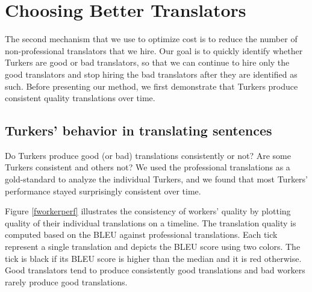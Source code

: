 \documentclass[11pt,letterpaper]{article}
\begin{document}
\section{Choosing Better Translators}

The second mechanism that we use to optimize cost is to reduce the number of non-professional translators that we hire.  Our goal is to quickly identify whether Turkers are good or bad translators, so that we can continue to hire only the good translators and stop hiring the bad translators after they are identified as such. 
%
Before presenting our method, we first demonstrate that Turkers produce consistent quality translations over time.


\subsection{Turkers' behavior in translating sentences}

Do Turkers produce good (or bad) translations consistently or not? Are some Turkers  consistent and others not? We used the professional translations as a gold-standard to analyze the individual Turkers, and we found that most Turkers' performance stayed surprisingly consistent over time. 

Figure \ref{fworkerperf} illustrates the consistency of workers' quality by plotting quality of their individual translations on a timeline. The translation quality is computed based on the BLEU against professional translations. Each tick represent a single translation and depicts the BLEU score using two colors. The tick is black if its BLEU score is higher than the median and it is red otherwise. Good translators tend to produce consistently good translations and bad workers rarely produce good translations.
\end{document}
